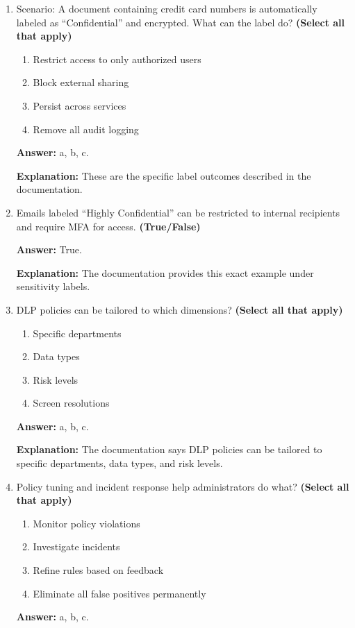 \documentclass[10pt]{article}
\begin{document}
\begin{enumerate}[leftmargin=*]
\textbf{Explanation:} The documentation states that labels can be applied manually or automatically.

\item Scenario: A document containing credit card numbers is automatically labeled as ``Confidential'' and encrypted. What can the label do? \textbf{(Select all that apply)}
\begin{enumerate}[label=\alph*., leftmargin=1.5em]
\item Restrict access to only authorized users
\item Block external sharing
\item Persist across services
\item Remove all audit logging
\end{enumerate}
\textbf{Answer:} a, b, c.

\textbf{Explanation:} These are the specific label outcomes described in the documentation.

\item Emails labeled ``Highly Confidential'' can be restricted to internal recipients and require MFA for access. \textbf{(True/False)}

\textbf{Answer:} True.

\textbf{Explanation:} The documentation provides this exact example under sensitivity labels.

\item DLP policies can be tailored to which dimensions? \textbf{(Select all that apply)}
\begin{enumerate}[label=\alph*., leftmargin=1.5em]
\item Specific departments
\item Data types
\item Risk levels
\item Screen resolutions
\end{enumerate}
\textbf{Answer:} a, b, c.

\textbf{Explanation:} The documentation says DLP policies can be tailored to specific departments, data types, and risk levels.

\item Policy tuning and incident response help administrators do what? \textbf{(Select all that apply)}
\begin{enumerate}[label=\alph*., leftmargin=1.5em]
\item Monitor policy violations
\item Investigate incidents
\item Refine rules based on feedback
\item Eliminate all false positives permanently
\end{enumerate}
\textbf{Answer:} a, b, c.


\end{enumerate}
\end{document}
